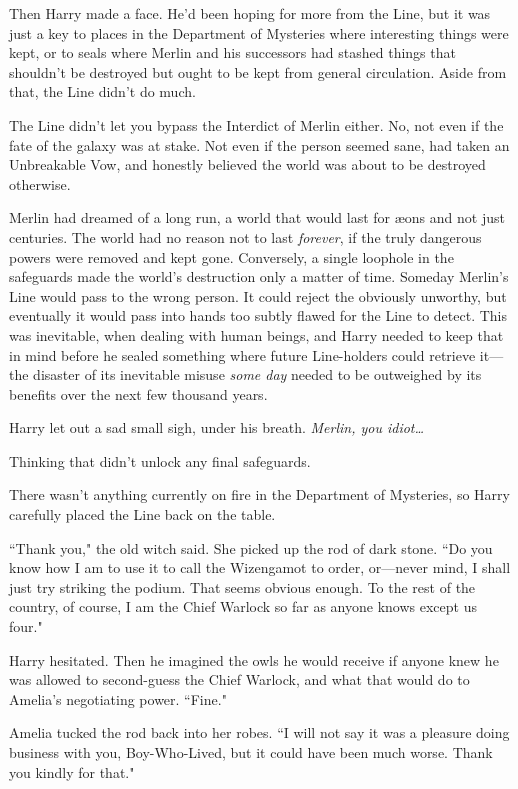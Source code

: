 Then Harry made a face. He'd been hoping for more from the Line, but it was just a key to places in the Department of Mysteries where interesting things were kept, or to seals where Merlin and his successors had stashed things that shouldn't be destroyed but ought to be kept from general circulation. Aside from that, the Line didn't do much.

The Line didn't let you bypass the Interdict of Merlin either. No, not even if the fate of the galaxy was at stake. Not even if the person seemed sane, had taken an Unbreakable Vow, and honestly believed the world was about to be destroyed otherwise.

Merlin had dreamed of a long run, a world that would last for æons and not just centuries. The world had no reason not to last \emph{forever}, if the truly dangerous powers were removed and kept gone. Conversely, a single loophole in the safeguards made the world's destruction only a matter of time. Someday Merlin's Line would pass to the wrong person. It could reject the obviously unworthy, but eventually it would pass into hands too subtly flawed for the Line to detect. This was inevitable, when dealing with human beings, and Harry needed to keep that in mind before he sealed something where future Line-holders could retrieve it—the disaster of its inevitable misuse \emph{some day} needed to be outweighed by its benefits over the next few thousand years.

Harry let out a sad small sigh, under his breath. \emph{Merlin, you idiot{\ldots}}

Thinking that didn't unlock any final safeguards.

There wasn't anything currently on fire in the Department of Mysteries, so Harry carefully placed the Line back on the table.

``Thank you," the old witch said. She picked up the rod of dark stone. ``Do you know how I am to use it to call the Wizengamot to order, or—never mind, I shall just try striking the podium. That seems obvious enough. To the rest of the country, of course, I am the Chief Warlock so far as anyone knows except us four."

Harry hesitated. Then he imagined the owls he would receive if anyone knew he was allowed to second-guess the Chief Warlock, and what that would do to Amelia's negotiating power. ``Fine."

Amelia tucked the rod back into her robes. ``I will not say it was a pleasure doing business with you, Boy-Who-Lived, but it could have been much worse. Thank you kindly for that."

